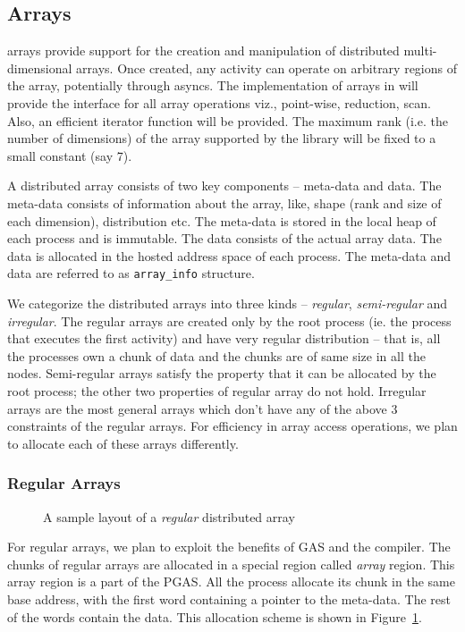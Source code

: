 \subsection{Arrays}

\Xten{} arrays provide support for the creation and manipulation of
distributed multi-dimensional arrays. Once created, any activity can
operate on arbitrary regions of the array, potentially through asyncs. The
implementation of \Xten{} arrays in \Xtenlib{} will provide the
interface for all \Xten{} array operations viz., point-wise, reduction,
scan. Also, an efficient iterator function will be provided. The maximum rank
(i.e. the number of dimensions) of the array supported by
the library will be fixed to a small constant (say 7). 

A distributed array consists of two key components -- meta-data and
data. The meta-data consists of information about the array, like,
shape (rank and size of each dimension), distribution etc. 
The meta-data is stored in the local heap of each process and
is immutable.
The data consists of the actual array data. The data is allocated
in the hosted address space of each process. The meta-data and
data are referred to as {\tt array\_info} structure.  

We categorize the distributed arrays into three kinds -- {\em regular},
{\em semi-regular} and {\em irregular}. The regular arrays are created
only by the root process (ie. the process that executes the first
activity) and have very regular distribution -- that is,
all the processes own a chunk of data and the chunks are of same size
in all the nodes. Semi-regular arrays satisfy the property that it can
be allocated by the root process; the other two properties of regular array
do not hold. Irregular arrays are the most
general arrays which don't have any of the above 3 constraints of the 
regular arrays. For efficiency in array access operations,
we plan to allocate each of these arrays differently.

\subsubsection{Regular Arrays}
\begin{figure}
\center
\caption{A sample layout of a {\em regular} distributed array}
\label{fig:array_layout_regular}
\end{figure}

For regular arrays, we plan to exploit the benefits of GAS and the compiler.
The chunks of regular arrays are allocated in a special region called {\em array}
region. This array region is a part of the PGAS. All the process allocate its
chunk in the same base address, with the first word containing a pointer to 
the meta-data. The rest of the words contain the data. This allocation scheme is shown in Figure~\ref{fig:array_layout_regular}.

